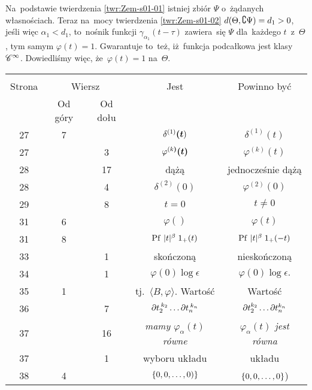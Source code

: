 \documentclass[a4paper,11pt]{article}
\begin{document}
\start {}  Na~podstawie
twierdzenia \ref{twr:Zem-s01-01} istniej zbiór $\Psi$ o~żądanych
własnościach. Teraz na~mocy twierdzenia \ref{twr:Zem-s01-02}
$d( \Theta, \complement \Psi ) = d_{ 1 } > 0$, jeśli więc
$\alpha_{ 1 } < d_{ 1 }$, to~nośnik funkcji
$\gamma_{ \alpha_{ 1 } }( t - \tau )$ zawiera~się $\Psi$ dla~każdego
$t$~z~$\Theta$, tym samym $\varphi( t ) = 1$. Gwarantuje to~też,
iż~funkcja podcałkowa jest klasy $\mathcal{C}^{ \infty }$. Dowiedliśmy więc,
że~$\varphi( t ) = 1$ na~$\Theta$.


\newpage
{}
\begin{center}
  \begin{tabular}{|c|c|c|c|c|}
    \hline
    & \multicolumn{2}{c|}{} & & \\
    Strona & \multicolumn{2}{c|}{Wiersz} & Jest
                              & Powinno być \\ \cline{2-3}
    & Od góry & Od dołu & & \\
    \hline
    27 & 7 & & $\delta^{ ( 1 ) }\boldsymbol{ ( t } )$ & $\delta^{ ( 1 ) }( t )$ \\
    27 & & 3 & $\varphi^{ ( k \boldsymbol{ ) } }\boldsymbol{ ( t ) } $
           & $\varphi^{ ( k ) }( t )$ \\
    28 & & 17 & dążą & jednocześnie dążą \\
    28 & & 4 & $\delta^{ ( 2 ) }( 0 )$ & $\varphi^{ ( 2 ) }( 0 )$ \\
    29 & & 8 & $t = 0$ & $t \neq 0$ \\
    31 & 6 & & $\varphi( )$ & $\varphi( t )$ \\
    31 & 8 & & $\mathrm{Pf}\, \, | t |^{ \beta } \; 1_{ + }( t )$
           & $\mathrm{Pf}\, \, | t |^{ \beta } \; 1_{ + }( -t )$ \\
    33 & & 1 & skończoną & nieskończoną \\
    34 & & 1 & $\varphi( 0 ) \log \epsilon$ & $\varphi( 0 ) \log \epsilon.$ \\
    35 & 1 & & tj.~$\langle B, \varphi \rangle$. Wartość & Wartość \\
    36 & & 7 & $\partial t_{ 2 }^{ \: k_{ 2 } } \ldots \partial t_{ n }^{ \: k_{ n } }$
           & $\partial t_{ 2 }^{ k_{ 2 } } \ldots \partial t_{ n }^{ k_{ n } }$ \\
    37 & & 16 & \emph{mamy $\varphi_{ \alpha }( t )$ równe}
           & \emph{$\varphi_{ \alpha }( t )$ jest równa} \\
    37 & & 1 & wyboru układu & układu \\
    38 & 4 & & $\{ 0, 0, \ldots, 0 ) \}$ & $\{ 0, 0, \ldots, 0 \}$) \\

\end{tabular}
\end{center}
\end{document}
